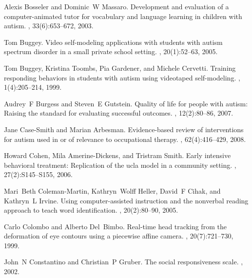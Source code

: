 \documentclass{ut-thesis}
\begin{document}
\begin{thebibliography}{100}
Alexis Bosseler and Dominic~W Massaro.
\newblock Development and evaluation of a computer-animated tutor for
  vocabulary and language learning in children with autism.
, 33(6):653--672,
  2003.

Tom Buggey.
\newblock Video self-modeling applications with students with autism spectrum
  disorder in a small private school setting.
,
  20(1):52--63, 2005.

Tom Buggey, Kristina Toombs, Pia Gardener, and Michele Cervetti.
\newblock Training responding behaviors in students with autism using
  videotaped self-modeling.
, 1(4):205--214,
  1999.

Audrey~F Burgess and Steven~E Gutstein.
\newblock Quality of life for people with autism: Raising the standard for
  evaluating successful outcomes.
, 12(2):80--86, 2007.

Jane Case-Smith and Marian Arbesman.
\newblock Evidence-based review of interventions for autism used in or of
  relevance to occupational therapy.
, 62(4):416--429, 2008.

Howard Cohen, Mila Amerine-Dickens, and Tristram Smith.
\newblock Early intensive behavioral treatment: Replication of the ucla model
  in a community setting.
,
  27(2):S145--S155, 2006.

Mari~Beth Coleman-Martin, Kathryn~Wolff Heller, David~F Cihak, and Kathryn~L
  Irvine.
\newblock Using computer-assisted instruction and the nonverbal reading
  approach to teach word identification.
,
  20(2):80--90, 2005.

Carlo Colombo and Alberto Del~Bimbo.
\newblock Real-time head tracking from the deformation of eye contours using a
  piecewise affine camera.
, 20(7):721--730, 1999.

John~N Constantino and Christian~P Gruber.
\newblock The social responsiveness scale.
, 2002.


\end{thebibliography}
\end{document}
